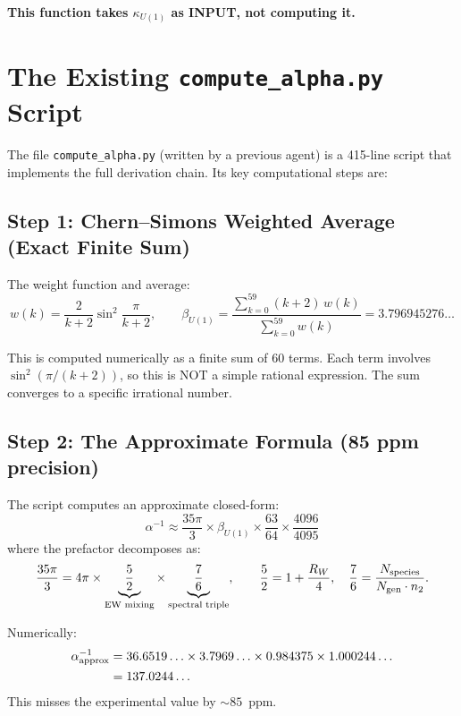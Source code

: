 \documentclass[11pt]{article}
\begin{document}
\textbf{This function takes $\kappa_{U(1)}$ as INPUT, not computing it.}

\section{The Existing \texttt{compute\_alpha.py} Script}

The file \texttt{compute\_alpha.py} (written by a previous agent) is a
415-line script that implements the full derivation chain. Its key
computational steps are:

\subsection{Step 1: Chern--Simons Weighted Average (Exact Finite Sum)}

The weight function and average:
\begin{equation}
w(k) = \frac{2}{k+2}\sin^2\!\frac{\pi}{k+2},
\qquad
\beta_{U(1)} = \frac{\sum_{k=0}^{59}(k+2)\,w(k)}{\sum_{k=0}^{59}w(k)}
= 3.796945276\ldots
\end{equation}

This is computed numerically as a finite sum of 60 terms. Each term involves
$\sin^2(\pi/(k+2))$, so this is NOT a simple rational expression. The sum
converges to a specific irrational number.

\subsection{Step 2: The Approximate Formula (85 ppm precision)}

The script computes an approximate closed-form:
\begin{equation}\label{eq:approx}
\boxed{
\alpha^{-1} \approx \frac{35\pi}{3} \times \beta_{U(1)}
  \times \frac{63}{64} \times \frac{4096}{4095}
}
\end{equation}
where the prefactor decomposes as:
\begin{equation}
\frac{35\pi}{3} = 4\pi \times \underbrace{\frac{5}{2}}_{\text{EW mixing}}
  \times \underbrace{\frac{7}{6}}_{\text{spectral triple}},
\qquad
\frac{5}{2} = 1 + \frac{R_W}{4}, \quad
\frac{7}{6} = \frac{N_{\rm species}}{N_{\rm gen}\cdot n_2}.
\end{equation}

Numerically:
\begin{align}
\alpha^{-1}_{\rm approx} &= 36.6519\ldots \times 3.7969\ldots
  \times 0.984375 \times 1.000244\ldots \\
&= 137.0244\ldots
\end{align}
This misses the experimental value by $\sim 85$~ppm.
\end{document}
